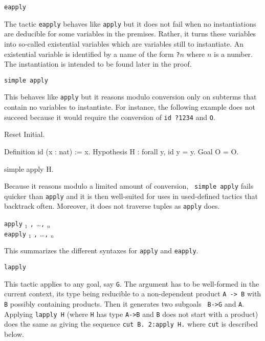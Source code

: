 \begin{coq_example*}
\begin{Variants}
\item {\tt eapply \term}\label{eapply}

  The tactic {\tt eapply} behaves like {\tt apply} but it does not fail
  when no instantiations are deducible for some variables in the
  premises.  Rather, it turns these variables into so-called
  existential variables which are variables still to instantiate. An
  existential variable is identified by a name of the form {\tt ?$n$}
  where $n$ is a number.  The instantiation is intended to be found
  later in the proof.

\item {\tt simple apply {\term}} 

  This behaves like {\tt apply} but it reasons modulo conversion only
  on subterms that contain no variables to instantiate. For instance,
  the following example does not succeed because it would require the
  conversion of {\tt id ?1234} and {\tt O}.

\begin{coq_eval}
Reset Initial.
\end{coq_eval}
\begin{coq_example*}
Definition id (x : nat) := x.
Hypothesis H : forall y, id y = y.
Goal O = O.
\end{coq_example*}
\begin{coq_example}
simple apply H.
\end{coq_example}

  Because it reasons modulo a limited amount of conversion, {\tt
  simple apply} fails quicker than {\tt apply} and it is then
  well-suited for uses in used-defined tactics that backtrack often.
  Moreover, it does not traverse tuples as {\tt apply} does.

\item {} {\tt apply} {\term$_1$}  {\tt ,} \ldots {\tt ,} {\term$_n$} \\
   {\tt eapply} {\term$_1$}  {\tt ,} \ldots {\tt ,} {\term$_n$} 

  This summarizes the different syntaxes for {\tt apply} and {\tt eapply}.

\item {\tt lapply {\term}} 

  This tactic applies to any goal, say {\tt G}.  The argument {\term}
  has to be well-formed in the current context, its type being
  reducible to a non-dependent product {\tt A -> B} with {\tt B}
  possibly containing products. Then it generates two subgoals {\tt
  B->G} and {\tt A}. Applying {\tt lapply H} (where {\tt H} has type
  {\tt A->B} and {\tt B} does not start with a product) does the same
  as giving the sequence {\tt cut B. 2:apply H.} where {\tt cut} is
  described below.


\end{Variants}
\end{coq_example*}
